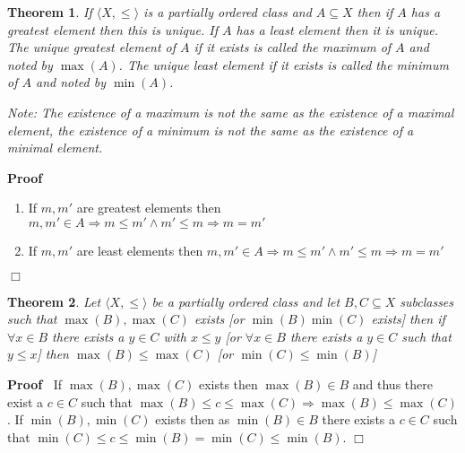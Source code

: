 \documentclass{book}
\newcommand{\nocomma}{}
\newenvironment{proof}{\noindent\textbf{Proof\ }}{\hspace*{\fill}$\Box$\medskip}
\newtheorem{theorem}{Theorem}
\begin{document}
{{\begin{theorem}
  \label{maximum and minimum}If $\langle X, \leqslant \rangle$ is a partially
  ordered class and $A \subseteq X$ then if $A$ has a greatest element then
  this is unique. If $A$ has a least element then it is unique. The unique
  greatest element of $A$ if it exists is called the maximum of $A$ and noted
  by $\max (A)$. The unique least element if it exists is called the minimum
  of $A$ and noted by $\min (A)$.
  
  Note: The existence of a maximum is not the same as the existence of a
  maximal element, the existence of a minimum is not the same as the existence
  of a minimal element.
\end{theorem}

\begin{proof}
  
  \begin{enumerate}
    \item If $m, m'$ are greatest elements then $m, m' \in A \Rightarrow m
    \leqslant m' \wedge m' \leqslant m \Rightarrow m = m'$
    
    \item If $m, m'$ are least elements then $m, m' \in A \Rightarrow m
    \leqslant m' \wedge m' \leqslant m \Rightarrow m = m'$
  \end{enumerate}
\end{proof}

\begin{theorem}
  \label{maximum of class with bigger elements then another class}Let $\langle
  X, \leqslant \rangle$ be a partially ordered class and let $B, C \subseteq
  X$ subclasses such that $\max (B), \max (C)$ exists [or $\min (B) \nocomma
  \min (C)$ exists] then if $\forall x \in B$ there exists a $y \in C$ with $x
  \leqslant y$ [or $\forall x \in B$ there exists a $y \in C$ such that $y
  \leqslant x$] then $\max (B) \leqslant \max (C)$ [or $\min (C) \leqslant
  \min (B)$] 
\end{theorem}

\begin{proof}
  If $\max (B), \max (C)$ exists then $\max (B) \in B$ and thus there exist a
  $c \in C$ such that $\max (B) \leqslant c \leqslant \max (C) \Rightarrow
  \max (B) \leqslant \max (C)$. If $\min (B), \min (C)$ exists then as $\min
  (B) \in B$ there exists a $c \in C$ such that $\min (C) \leqslant c
  \leqslant \min (B) = \min (C) \leqslant \min (B)$.
\end{proof}

}}
\end{document}
